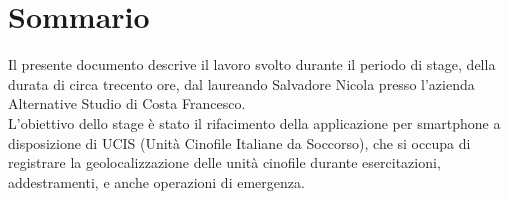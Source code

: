 
\cleardoublepage
{}
{}
\begingroup
\let\clearpage\relax
\let\cleardoublepage\relax
\let\cleardoublepage\relax

\chapter*{Sommario}

Il presente documento descrive il lavoro svolto durante il periodo di stage, della durata
di circa trecento ore, dal laureando Salvadore Nicola presso l'azienda Alternative Studio
di Costa Francesco.\\
\noindent L'obiettivo dello stage è stato il rifacimento della applicazione per
smartphone a disposizione di UCIS (Unità Cinofile Italiane da Soccorso), che si occupa di
registrare la geolocalizzazione delle unità cinofile durante  esercitazioni,
addestramenti, e anche operazioni di emergenza.

%
%

\endgroup

\vfill
